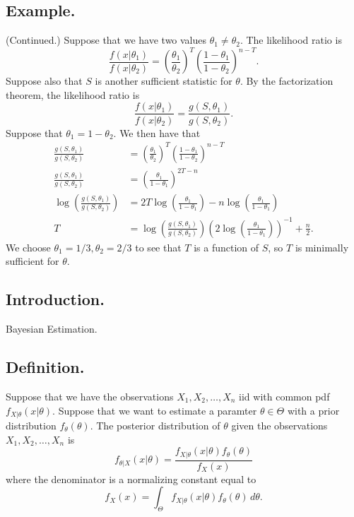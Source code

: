 \documentclass[titlepage]{article}
\begin{document}
\subsection{Example.} (Continued.) Suppose that we have two values $\theta_{1} \neq \theta_{2}$. The likelihood ratio is 
$$\frac{f(x|\theta_{1})}{f(x|\theta_{2})} = \left(\frac{\theta_{1}}{\theta_{2}}\right)^{T}\left(\frac{1-\theta_{1}}{1-\theta_{2}}\right)^{n-T}.$$
Suppose also that $S$ is another sufficient statistic for $\theta$. By the factorization theorem, the likelihood ratio is 
$$\frac{f(x|\theta_{1})}{f(x|\theta_{2})} = \frac{g(S, \theta_{1})}{g(S, \theta_{2})}.$$
Suppose that $\theta_{1} = 1 - \theta_{2}$. We then have that 
\begin{align*}
                     \frac{g(S, \theta_{1})}{g(S, \theta_{2})} &= \left(\frac{\theta_{1}}{\theta_{2}}\right)^{T}\left(\frac{1-\theta_{1}}{1-\theta_{2}}\right)^{n-T} \\
                     \frac{g(S, \theta_{1})}{g(S, \theta_{2})} &= \left(\frac{\theta_{1}}{1-\theta_{1}}\right)^{2T-n} \\
    \log\left(\frac{g(S, \theta_{1})}{g(S, \theta_{2})}\right) &= 2T\log\left(\frac{\theta_{1}}{1-\theta_{1}}\right) - n\log\left(\frac{\theta_{1}}{1-\theta_{1}}\right) \\
                                                             T &= \log\left(\frac{g(S, \theta_{1})}{g(S, \theta_{2})}\right)\left(2\log\left(\frac{\theta_{1}}{1-\theta_{1}}\right)\right)^{-1} + \frac{n}{2}.
\end{align*}
We choose $\theta_{1} = 1/3, \theta_{2} = 2/3$ to see that $T$ is a function of $S$, so $T$ is minimally sufficient for $\theta$.

\newpage {}

\subsection{Introduction.} Bayesian Estimation.

\subsection{Definition.} Suppose that we have the observations $X_{1}, X_{2}, \ldots, X_{n}$ iid with common pdf $f_{X|\theta}(x|\theta)$. Suppose that we want to estimate a paramter $\theta \in \Theta$ with a prior distribution 
$f_{\theta}(\theta)$. The posterior distribution of $\theta$ given the observations $X_{1}, X_{2}, \ldots, X_{n}$ is
$$f_{\theta|X}(x|\theta) = \frac{f_{X|\theta}(x|\theta)f_{\theta}(\theta)}{f_{X}(x)}$$
where the denominator is a normalizing constant equal to 
$$f_{X}(x) = \int_{\Theta}f_{X|\theta}(x|\theta)f_{\theta}(\theta)\, d\theta.$$
\end{document}
